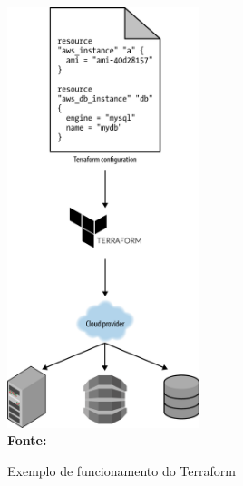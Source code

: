   \begin{figure}[ht]
	\centering	
	\caption[\hspace{0.1cm}Exemplo de funcionamento do Terraform]{Exemplo de funcionamento do Terraform}
	\vspace{-0.4cm}
	\includegraphics[width=0.5\textwidth]{figuras/terraform-working.png}
	 \vspace{-0.2cm}
	\\\textbf{\footnotesize Fonte: \cite{oreilly}}
	\label{fig:figura7}
\end{figure}
\vspace{-0.5cm}
 


 